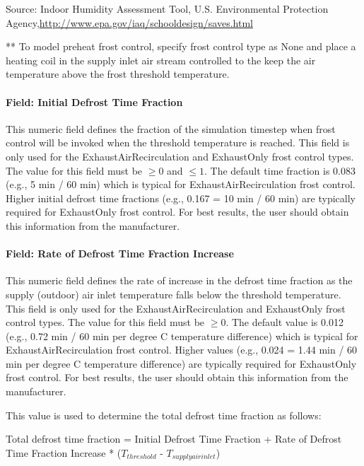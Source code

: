 Source: Indoor Humidity Assessment Tool, U.S. Environmental Protection Agency,\url{http://www.epa.gov/iaq/schooldesign/saves.html}

** To model preheat frost control, specify frost control type as None and place a heating coil in the supply inlet air stream controlled to the keep the air temperature above the frost threshold temperature.

\paragraph{Field: Initial Defrost Time Fraction}\label{field-initial-defrost-time-fraction}

This numeric field defines the fraction of the simulation timestep when frost control will be invoked when the threshold temperature is reached. This field is only used for the ExhaustAirRecirculation and ExhaustOnly frost control types. The value for this field must be \(\ge 0\) and \(\le 1\). The default time fraction is 0.083 (e.g., 5 min / 60 min) which is typical for ExhaustAirRecirculation frost control. Higher initial defrost time fractions (e.g., 0.167 = 10 min / 60 min) are typically required for ExhaustOnly frost control. For best results, the user should obtain this information from the manufacturer.

\paragraph{Field: Rate of Defrost Time Fraction Increase}\label{field-rate-of-defrost-time-fraction-increase}

This numeric field defines the rate of increase in the defrost time fraction as the supply (outdoor) air inlet temperature falls below the threshold temperature. This field is only used for the ExhaustAirRecirculation and ExhaustOnly frost control types. The value for this field must be \(\ge 0\). The default value is 0.012 (e.g., 0.72 min / 60 min per degree C temperature difference) which is typical for ExhaustAirRecirculation frost control. Higher values (e.g., 0.024 = 1.44 min / 60 min per degree C temperature difference) are typically required for ExhaustOnly frost control. For best results, the user should obtain this information from the manufacturer.

This value is used to determine the total defrost time fraction as follows:


Total defrost time fraction = Initial Defrost Time Fraction +
Rate of Defrost Time Fraction Increase * (\(T_{threshold}\) - \(T_{supply air inlet}\))

